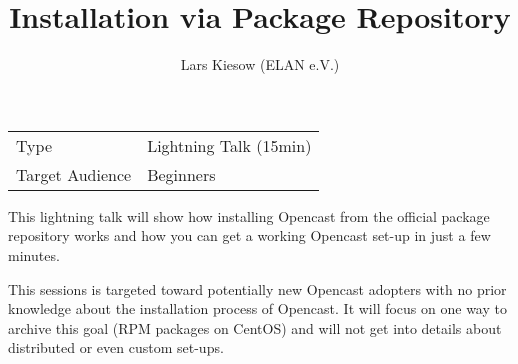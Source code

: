 \documentclass[a4paper]{article}
\title{Installation via Package Repository}
\author{Lars Kiesow (ELAN e.V.)}
\begin{document}
\maketitle

\begin{center}
\begin{tabular}{ll}
\toprule
	Type            & Lightning Talk (15min) \\
	Target Audience & Beginners \\
\bottomrule
\end{tabular}
\end{center}

\vspace{1em}

This lightning talk will show how installing Opencast from the official package
repository works and how you can get a working Opencast set-up in just a few
minutes.

This sessions is targeted toward potentially new Opencast adopters with no
prior knowledge about the installation process of Opencast. It will focus on
one way to archive this goal (RPM packages on CentOS) and will not get into
details about distributed or even custom set-ups.
\end{document}
